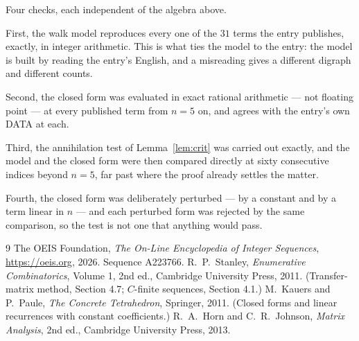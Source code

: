 \documentclass[11pt,a4paper]{article}
\theoremstyle{plain}
\theoremstyle{definition}
\begin{document}
Four checks, each independent of the algebra above.

First, the walk model reproduces every one of the $31$ terms the entry publishes,
exactly, in integer arithmetic. This is what ties the model to the entry: the model is built
by reading the entry's English, and a misreading gives a different digraph and different
counts.

Second, the closed form was evaluated in exact rational arithmetic --- not floating point ---
at every published term from $n=5$ on, and agrees with the entry's own DATA at each.

Third, the annihilation test of Lemma~\ref{lem:crit} was carried out exactly, and the model
and the closed form were then compared directly at sixty consecutive indices beyond
$n=5$, far past where the proof already settles the matter.

Fourth, the closed form was deliberately perturbed --- by a constant and by a term linear in
$n$ --- and each perturbed form was rejected by the same comparison, so the test is not one
that anything would pass.

\begin{thebibliography}{9}
 The OEIS Foundation, \emph{The On-Line Encyclopedia of Integer
Sequences}, \url{https://oeis.org}, 2026. Sequence A223766.
 R.~P.~Stanley, \emph{Enumerative Combinatorics}, Volume 1, 2nd ed.,
Cambridge University Press, 2011. (Transfer-matrix method, Section 4.7; $C$-finite sequences,
Section 4.1.)
 M.~Kauers and P.~Paule, \emph{The Concrete Tetrahedron}, Springer, 2011.
(Closed forms and linear recurrences with constant coefficients.)
 R.~A.~Horn and C.~R.~Johnson, \emph{Matrix Analysis}, 2nd ed., Cambridge
University Press, 2013.
\end{thebibliography}
\end{document}
